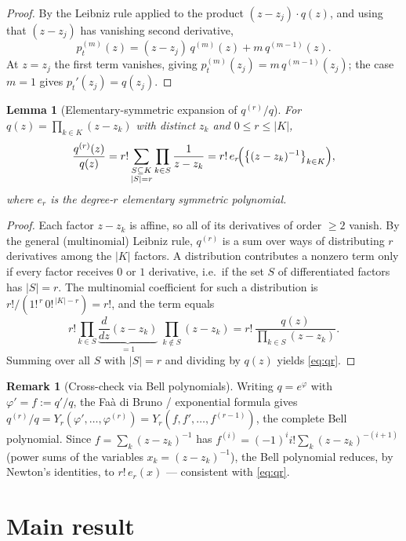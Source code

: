 \documentclass[11pt]{article}
\theoremstyle{plain}
\newtheorem{lemma}{Lemma}
\theoremstyle{definition}
\newtheorem{remark}{Remark}
\begin{document}
\begin{proof}
By the Leibniz rule applied to the product $(z-z_j)\cdot q(z)$, and using that
$(z-z_j)$ has vanishing second derivative,
\[
  p_t^{(m)}(z)=(z-z_j)\,q^{(m)}(z)+m\,q^{(m-1)}(z).
\]
At $z=z_j$ the first term vanishes, giving
$p_t^{(m)}(z_j)=m\,q^{(m-1)}(z_j)$; the case $m=1$ gives $p_t'(z_j)=q(z_j)$.
\end{proof}

\begin{lemma}[Elementary-symmetric expansion of $q^{(r)}/q$]\label{lem:qr}
For $q(z)=\prod_{k\in K}(z-z_k)$ with distinct $z_k$ and $0\le r\le|K|$,
\begin{equation}\label{eq:qr}
  \frac{q^{(r)}(z)}{q(z)}
   = r!\sum_{\substack{S\subseteq K\\ |S|=r}}\prod_{k\in S}\frac{1}{z-z_k}
   = r!\,e_r\!\Bigl(\bigl\{(z-z_k)^{-1}\bigr\}_{k\in K}\Bigr),
\end{equation}
where $e_r$ is the degree-$r$ elementary symmetric polynomial.
\end{lemma}

\begin{proof}
Each factor $z-z_k$ is affine, so all of its derivatives of order $\ge 2$
vanish. By the general (multinomial) Leibniz rule, $q^{(r)}$ is a sum over ways
of distributing $r$ derivatives among the $|K|$ factors. A distribution
contributes a nonzero term only if every factor receives $0$ or $1$
derivative, i.e.\ if the set $S$ of differentiated factors has $|S|=r$. The
multinomial coefficient for such a distribution is
$r!/(1!^{\,r}\,0!^{\,|K|-r})=r!$, and the term equals
\[
  r!\prod_{k\in S}\underbrace{\frac{d}{dz}(z-z_k)}_{=1}\;\prod_{k\notin S}(z-z_k)
  = r!\,\frac{q(z)}{\prod_{k\in S}(z-z_k)} .
\]
Summing over all $S$ with $|S|=r$ and dividing by $q(z)$ yields \eqref{eq:qr}.
\end{proof}

\begin{remark}[Cross-check via Bell polynomials]
Writing $q=e^{\varphi}$ with $\varphi'=f:=q'/q$, the Fa\`a di Bruno / exponential
formula gives $q^{(r)}/q=Y_r(\varphi',\dots,\varphi^{(r)})=Y_r(f,f',\dots,f^{(r-1)})$,
the complete Bell polynomial. Since $f=\sum_{k}(z-z_k)^{-1}$ has
$f^{(i)}=(-1)^i i!\sum_k (z-z_k)^{-(i+1)}$ (power sums of the variables
$x_k=(z-z_k)^{-1}$), the Bell polynomial reduces, by Newton's identities, to
$r!\,e_r(x)$ --- consistent with \eqref{eq:qr}.
\end{remark}

\section{Main result}
\end{document}
